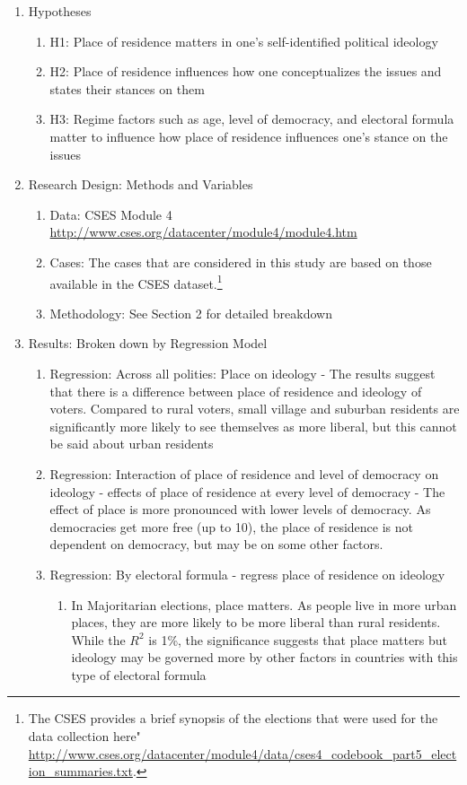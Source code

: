 \documentclass[12pt]{article}
\begin{document}
\begin{enumerate}
\begin{enumerate}
\end{enumerate}
\item Hypotheses
\begin{enumerate}
	\item H1: Place of residence matters in one's self-identified political ideology
	\item H2: Place of residence influences how one conceptualizes the issues and states their stances on them
	\item H3: Regime factors such as age, level of democracy, and electoral formula matter to influence how place of residence influences one's stance on the issues
\end{enumerate}
\item Research Design: Methods and Variables 
\begin{enumerate}
	\item Data: CSES Module 4 \url{http://www.cses.org/datacenter/module4/module4.htm}
	\item Cases: The cases that are considered in this study are based on those available in the CSES dataset.\footnote{The CSES provides a brief synopsis of the elections that were used for the data collection here" \url{http://www.cses.org/datacenter/module4/data/cses4_codebook_part5_election_summaries.txt}.}
	\item Methodology: See Section 2 for detailed breakdown
\end{enumerate}
\item Results: Broken down by Regression Model
\begin{enumerate}
	\item Regression: Across all polities: Place on ideology - The results suggest that there is a difference between place of residence and ideology of voters. Compared to rural voters, small village and suburban residents are significantly more likely to see themselves as more liberal, but this cannot be said about urban residents 
	\item Regression: Interaction of place of residence and level of democracy on ideology - effects of place of residence at every level of democracy - The effect of place is more pronounced with lower levels of democracy. As democracies get more free (up to 10), the place of residence is not dependent on democracy, but may be on some other factors.
	\item Regression: By electoral formula - regress place of residence on ideology
	\begin{enumerate}
		\item In Majoritarian elections, place matters. As people live in more urban places, they are more likely to be more liberal than rural residents. While the $R^2$ is 1\%, the significance suggests that place matters but ideology may be governed more by other factors in countries with this type of electoral formula

\end{enumerate}
\end{enumerate}
\end{enumerate}
\end{document}
